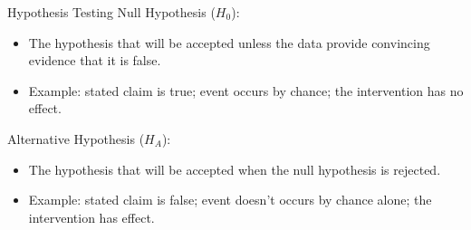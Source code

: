 \documentclass{beamer}
\newcommand{\ignore}[1]{}
\let\thefootnote\relax\footnotetext{\tiny{*  Office Hours: Wed \& Fri 10:00 - 11:30 AM, KMC 8-174}}
\begin{document}
\begin{frame}{Hypothesis Testing}
Null Hypothesis ($H_0$):
\begin{itemize}
\item The hypothesis that will be accepted unless the data provide convincing evidence that it is false.
\item Example: stated claim is true; event occurs by chance; the intervention has no effect.
\end{itemize}
Alternative Hypothesis ($H_A$):
\begin{itemize}
\item The hypothesis that will be accepted when the null hypothesis is rejected. %
\item Example:  stated claim is false; event doesn't occurs by chance alone; the intervention has effect.
\end{itemize}
\end{frame}

\ignore{
\begin{frame}{Time Series Plot}
\begin{figure}
    \caption{}
    \texttt{[image: figures/coindesk-bpi-chart]}
\end{figure}
\let\thefootnote\relax\footnotetext{\tiny{* Plot from Coindesk.com}}
\end{frame}

\begin{frame}{}
\begin{itemize}
\item 
\end{itemize}
\end{frame}

\vspace{\stretch{0.5}}

\begin{block}{}
\end{block}


}
\end{document}
